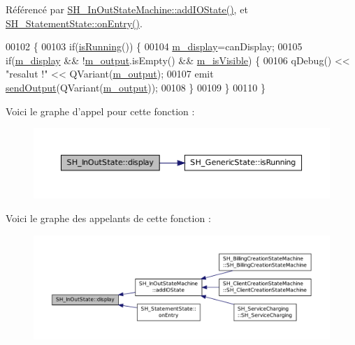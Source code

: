 Référencé par \hyperlink{classSH__InOutStateMachine_a2528cffddbe6f98c32ebef41423c0118}{S\-H\-\_\-\-In\-Out\-State\-Machine\-::add\-I\-O\-State()}, et \hyperlink{classSH__StatementState_ab866a023213fe1bd1857705bf98a8f65}{S\-H\-\_\-\-Statement\-State\-::on\-Entry()}.


\begin{DoxyCode}
00102 \{
00103     \textcolor{keywordflow}{if}(\hyperlink{classSH__GenericState_a5f731810dad0cacd28828ccbf1539e4e}{isRunning}()) \{
00104         \hyperlink{classSH__InOutState_a3351fa53593266a1ae4334d33d0b1610}{m\_display}=canDisplay;
00105         \textcolor{keywordflow}{if}(\hyperlink{classSH__InOutState_a3351fa53593266a1ae4334d33d0b1610}{m\_display} && !\hyperlink{classSH__InOutState_ae735e741ce229d2600448d8daa0abc2d}{m\_output}.isEmpty() && \hyperlink{classSH__InOutState_a8fd66b185c9a55f0e84daa97e2acf53a}{m\_isVisible}) \{
00106             qDebug() << \textcolor{stringliteral}{"resalut !"} << QVariant(\hyperlink{classSH__InOutState_ae735e741ce229d2600448d8daa0abc2d}{m\_output});
00107             emit \hyperlink{classSH__InOutState_a77921c5f42059bc97361f4ff7827da12}{sendOutput}(QVariant(\hyperlink{classSH__InOutState_ae735e741ce229d2600448d8daa0abc2d}{m\_output}));
00108         \}
00109     \}
00110 \}
\end{DoxyCode}


Voici le graphe d'appel pour cette fonction \-:\nopagebreak
\begin{figure}[H]
\begin{center}
\leavevmode
\includegraphics[width=350pt]{classSH__InOutState_a616f88b20478b81b2927a9ddc2b4f521_cgraph}
\end{center}
\end{figure}




Voici le graphe des appelants de cette fonction \-:\nopagebreak
\begin{figure}[H]
\begin{center}
\leavevmode
\includegraphics[width=350pt]{classSH__InOutState_a616f88b20478b81b2927a9ddc2b4f521_icgraph}
\end{center}
\end{figure}


